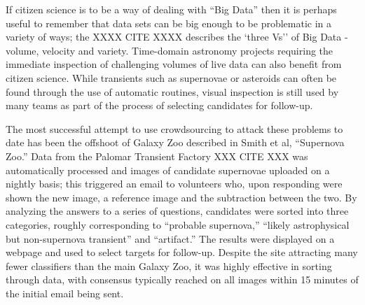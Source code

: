 \documentclass{ar2e}
\begin{document}






If citizen science is to be a way of dealing with ``Big Data'' then it is
perhaps useful to remember that data sets can be big enough to be problematic in
a variety of ways; the XXXX CITE XXXX describes the `three Vs'' of Big Data -
volume, velocity and variety. Time-domain astronomy projects requiring the
immediate inspection of challenging  volumes of live data can also benefit from
citizen science. While transients such as supernovae or asteroids can often be
found through the use of automatic routines, visual inspection is still used by
many teams as part of the process of selecting candidates for follow-up. 


The most successful attempt to use crowdsourcing to attack these problems to
date has been the offshoot of Galaxy Zoo described in Smith et al, ``Supernova
Zoo.'' Data from the Palomar Transient Factory XXX CITE XXX was automatically
processed and images of candidate supernovae uploaded on a nightly basis; this
triggered an email to volunteers who, upon responding were shown the new image,
a reference image and the subtraction between the two. By analyzing the answers
to a series of questions, candidates were sorted into three categories, roughly
corresponding to ``probable supernova,'' ``likely astrophysical but
non-supernova transient'' and ``artifact.'' The results were displayed on a
webpage and used to select targets for follow-up. Despite the site attracting
many fewer classifiers than the main Galaxy Zoo, it was highly effective in
sorting through data, with consensus typically reached on all images within 15
minutes of the initial email being sent. 
\end{document}
